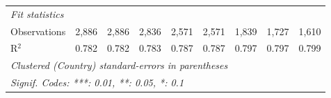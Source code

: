 \begin{tabular}{lcccccccc}
   \midrule \emph{Fit statistics}\\
   Observations                                               & 2,886        & 2,886        & 2,836         & 2,571        & 2,571        & 1,839        & 1,727         & 1,610\\  
   R$^2$                                                      & 0.782        & 0.782        & 0.783         & 0.787        & 0.787        & 0.797        & 0.797         & 0.799\\  
   \midrule
   \multicolumn{9}{l}{\emph{Clustered (Country) standard-errors in parentheses}}\\
   \multicolumn{9}{l}{\emph{Signif. Codes: ***: 0.01, **: 0.05, *: 0.1}}\\
\end{tabular}
\par\endgroup


